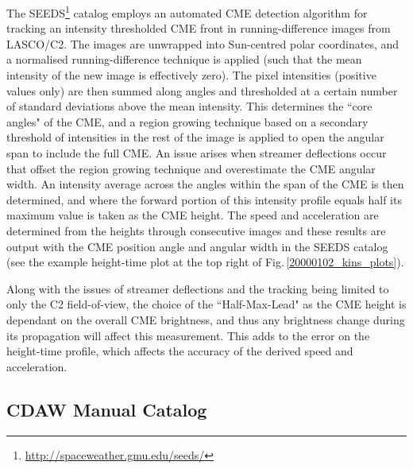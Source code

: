 \documentclass[referee,a4paper,12pt,traditabstract]{swsc}
\begin{document}
The SEEDS\footnote{\href{http://spaceweather.gmu.edu/seeds/}{http://spaceweather.gmu.edu/seeds/}} catalog employs an automated CME detection algorithm for tracking an intensity thresholded CME front in running-difference images from LASCO/C2. The images are unwrapped into Sun-centred polar coordinates, and a normalised running-difference technique is applied (such that the mean intensity of the new image is effectively zero). The pixel intensities (positive values only) are then summed along angles and thresholded at a certain number of standard deviations above the mean intensity. This determines the ``core angles" of the CME, and a region growing technique based on a secondary threshold of intensities in the rest of the image is applied to open the angular span to include the full CME. An issue arises when streamer deflections occur that offset the region growing technique and overestimate the CME angular width. An intensity average across the angles within the span of the CME is then determined, and where the forward portion of this intensity profile equals half its maximum value is taken as the CME height. The speed and acceleration are determined from the heights through consecutive images and these results are output with the CME position angle and angular width in the SEEDS catalog (see the example height-time plot at the top right of Fig.\,\ref{20000102_kins_plots}).

Along with the issues of streamer deflections and the tracking being limited to only the C2 field-of-view, the choice of the ``Half-Max-Lead" as the CME height is dependant on the overall CME brightness, and thus any brightness change during its propagation will affect this measurement. This adds to the error on the height-time profile, which affects the accuracy of the derived speed and acceleration.

\subsection{CDAW Manual Catalog}
\end{document}
